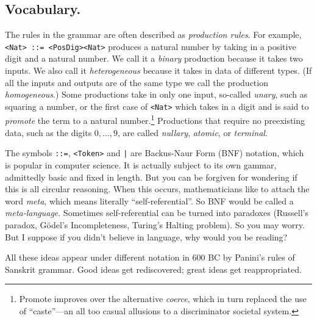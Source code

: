 \subsection{Vocabulary.} The rules in
the grammar are often described as \emph{production rules}.  For example,
\lstinline{<Nat> ::= <PosDig><Nat>} produces a natural number by taking in a
positive digit and a natural number.  We call it a \emph{binary} production
because it takes two inputs.  We also call it \emph{heterogeneous} because it
takes in data of different types.  (If all the inputs and outputs are of the
same type we call the production \emph{homogeneous}.)  Some productions take in
only one input, so-called \emph{unary}, such as squaring a number, or the first
case of \lstinline{<Nat>} which takes in a digit and is said to \emph{promote}
the term to a natural number.\footnote{Promote improves over the alternative
\emph{coerce}, which in turn replaced the use of ``caste''---an all too casual
allusions to a discriminator societal system.} Productions that require no
preexisting data, such as the digits $0,\ldots,9$, are called \emph{nullary},
\emph{atomic}, or \emph{terminal}. 

\begin{remark}
The symbols \lstinline{::=}, \lstinline{<Token>} and \lstinline{|} are 
Backus-Naur Form (BNF) notation, which is popular 
in computer science.  It is actually subject to its own gammar, admittedly 
basic and fixed in length.  But you can be forgiven for wondering if this is 
all circular reasoning.  When this occurs, mathematicians like to attach 
the word \emph{meta}, which means literally ``self-referential''.
So BNF would be called a \emph{meta-language}. Sometimes self-referential 
can be turned into paradoxes (Russell's paradox, G\"odel's Incompleteness,
Turing's Halting problem).  So you may worry.  But I suppose if you 
didn't believe in language, why would you be reading?\\
\end{remark}

All these ideas appear under different notation in 600 BC by Panini's rules of
Sanskrit grammar.  Good ideas get rediscovered; great ideas get reappropriated.



